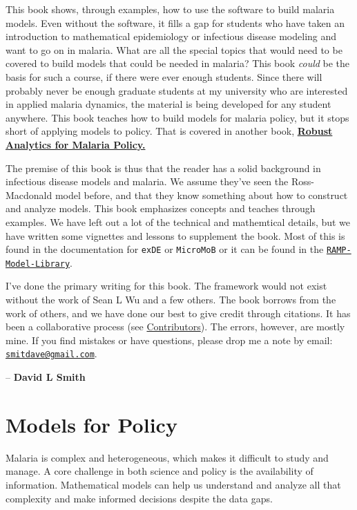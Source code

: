 \documentclass[
]{book}
\begin{document}
This book shows, through examples, how to use the software to build malaria models. Even without the software, it fills a gap for students who have taken an introduction to mathematical epidemiology or infectious disease modeling and want to go on in malaria. What are all the special topics that would need to be covered to build models that could be needed in malaria? This book \emph{could} be the basis for such a course, if there were ever enough students. Since there will probably never be enough graduate students at my university who are interested in applied malaria dynamics, the material is being developed for any student anywhere. This book teaches how to build models for malaria policy, but it stops short of applying models to policy. That is covered in another book, \href{../../RAMP-Book/_book/index.html}{\textbf{Robust Analytics for Malaria Policy.}}

The premise of this book is thus that the reader has a solid background in infectious disease models and malaria. We assume they've seen the Ross-Macdonald model before, and that they know something about how to construct and analyze models. This book emphasizes concepts and teaches through examples. We have left out a lot of the technical and mathemtical details, but we have written some vignettes and lessons to supplement the book. Most of this is found in the documentation for \texttt{exDE} or \texttt{MicroMoB} or it can be found in the \href{../../RAMP-Model-Library/RAMP-Model-Library.html}{\texttt{RAMP-Model-Library}}.

I've done the primary writing for this book. The framework would not exist without the work of Sean L Wu and a few others. The book borrows from the work of others, and we have done our best to give credit through citations. It has been a collaborative process (see \protect\hyperlink{contributors}{Contributors}). The errors, however, are mostly mine. If you find mistakes or have questions, please drop me a note by email: \href{mailto:smitdave@gmail.com}{\nolinkurl{smitdave@gmail.com}}.

-- \textbf{David L Smith}

\clearpage

\hypertarget{models-for-policy}{%
\section*{Models for Policy}\label{models-for-policy}}

Malaria is complex and heterogeneous, which makes it difficult to study and manage. A core challenge in both science and policy is the availability of information. Mathematical models can help us understand and analyze all that complexity and make informed decisions despite the data gaps.
\end{document}
